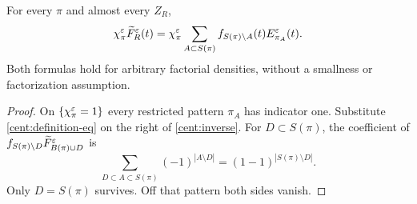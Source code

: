 \begin{proposition}\label{cent:identity}
For every $\pi$ and almost every $Z_R$,
\begin{equation}\label{cent:inverse}
 \chi_\pi^\varepsilon\widetilde F_R^\varepsilon(t)
 =\chi_\pi^\varepsilon
 \sum_{A\subset S(\pi)}f_{S(\pi)\setminus A}(t)
 E_{\pi_A}^\varepsilon(t).
\end{equation}
Both formulas hold for arbitrary factorial densities, without a
smallness or factorization assumption.
\end{proposition}
\begin{proof}
On $\{\chi_\pi^\varepsilon=1\}$ every restricted pattern $\pi_A$ has indicator
one. Substitute \eqref{cent:definition-eq} on the right of
\eqref{cent:inverse}. For $D\subset S(\pi)$, the coefficient of
$f_{S(\pi)\setminus D}\widetilde F_{B(\pi)\cup D}^\varepsilon$ is
\[
 \sum_{D\subset A\subset S(\pi)}(-1)^{|A\setminus D|}
 =(1-1)^{|S(\pi)\setminus D|}.
\]
Only $D=S(\pi)$ survives. Off that pattern both sides vanish.
\end{proof}

